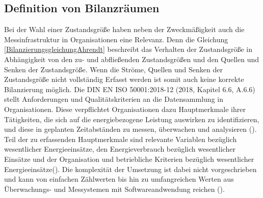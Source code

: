 \subsection{Definition von Bilanzräumen}


Bei der Wahl einer Zustandsgröße haben neben der Zweckmäßigkeit auch die Messinfrastruktur in Organisationen eine Relevanz.
Denn die Gleichung \eqref{BilanzierungsgleichungAhrendt} beschreibt das Verhalten der Zustandsgröße in Abhängigkeit von den zu- und abfließenden Zustandsgrößen und den 
Quellen und Senken der Zustandsgröße. Wenn die Ströme, Quellen und Senken der Zustandsgröße nicht vollständig Erfasst werden ist somit auch keine korrekte Bilanzierung 
möglich. 
Die DIN EN ISO 50001:2018-12 (2018, Kapitel 6.6, A.6.6) stellt Anforderungen und Qualitätskriterien an die Datensammlung in Organisationen.
Diese verpflichtet Organisationen dazu Hauptmerkmale ihrer Tätigkeiten, die sich auf die energiebezogene Leistung auswirken zu identifizieren, und diese in geplanten 
Zeitabständen zu messen, überwachen und analysieren (\cite[S. 23]{DIN50001.2018}).
Teil der zu erfassenden Hauptmerkmale sind relevante Variablen bezüglich wesentlicher Energieeinsätze, den Energieverbrauch bezüglich wesentlicher Einsätze 
und der Organisation und betriebliche Kriterien bezüglich wesentlicher Energieeinsätze(\cite[S. 23]{DIN50001.2018}).
Die komplexität der Umsetzung ist dabei nicht vorgeschrieben und kann von einfachen Zählwerten bis hin zu umfangreichen Werten aus Überwachungs- und Messystemen mit 
Softwareandwendung reichen (\cite[S. 36]{DIN50001.2018}).